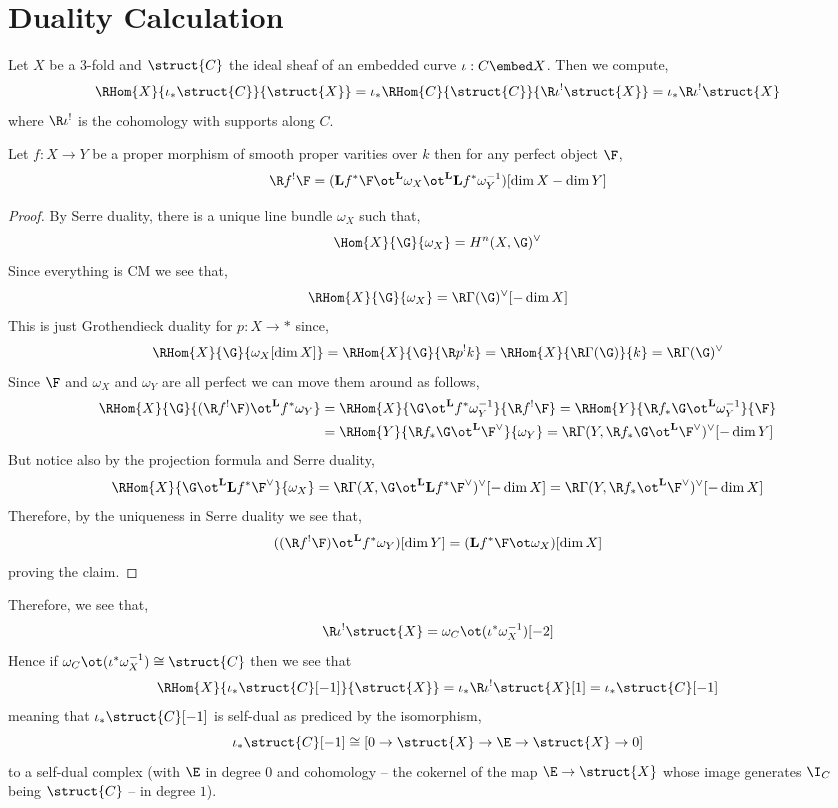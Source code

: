 \documentclass[12pt]{article}
\begin{document}
\section{Duality Calculation}

\newcommand{\bfL}{\mathbf{L}}

Let $X$ be a 3-fold and $\struct{C}$ the ideal sheaf of an embedded curve $\iota : C \embed X$. Then we compute,
\[ \RHom{X}{\iota_* \struct{C}}{\struct{X}} = \iota_* \RHom{C}{\struct{C}}{\R \iota^! \struct{X}} = \iota_* \R \iota^! \struct{X} \]
where $\R \iota^!$ is the cohomology with supports along $C$. 

\begin{prop}
Let $f : X \to Y$ be a proper morphism of smooth proper varities over $k$ then for any perfect object $\F$,
 \[ \R f^! \F = (\bfL f^* \F \ot^{\bfL} \omega_X \ot^{\bfL} \bfL f^* \omega_Y^{-1}) [\dim{X} - \dim{Y}] \]
\end{prop}

\begin{proof}
By Serre duality, there is a unique line bundle $\omega_X$ such that,
\[ \Hom{X}{\G}{\omega_X} = H^n(X, \G)^\vee \]
Since everything is CM we see that,
\[ \RHom{X}{\G}{\omega_X} = \R \Gamma(\G)^\vee [-\dim{X}] \]
This is just Grothendieck duality for $p : X \to *$ since,
\[ \RHom{X}{\G}{\omega_X[\dim{X}]} = \RHom{X}{\G}{\R p^! k} = \RHom{X}{\R \Gamma(\G)}{k}  = \R \Gamma(\G)^{\vee} \]
Since $\F$ and $\omega_X$ and $\omega_Y$ are all perfect we can move them around as follows,
\begin{align*}
\RHom{X}{\G}{(\R f^! \F) \ot^{\bfL} f^* \omega_Y} &= \RHom{X}{\G \ot^{\bfL} f^* \omega_Y^{-1}}{\R f^! \F} = \RHom{Y}{\R f_* \G \ot^{\bfL} \omega_Y^{-1}}{\F} 
\\
& = \RHom{Y}{\R f_* \G \ot^{\bfL} \F^\vee}{\omega_Y} = \R\Gamma(Y, \R f_* \G \ot^{\bfL} \F^\vee)^\vee [-\dim{Y}] 
\end{align*}
But notice also by the projection formula and Serre duality,
\[ \RHom{X}{\G \ot^{\bfL} \bfL f^* \F^\vee}{\omega_X} = \R \Gamma(X, \G \ot^{\bfL} \bfL f^* \F^\vee)^\vee [-\dim{X}] = \R\Gamma(Y, \R f_* \ot^{\bfL} \F^\vee)^\vee [-\dim{X}]  \]
Therefore, by the uniqueness in Serre duality we see that,
\[ ((\R f^! \F) \ot^{\bfL} f^* \omega_Y)[\dim{Y}] = (\bfL f^* \F \ot \omega_X)[\dim{X}] \]
proving the claim.
\end{proof}
Therefore, we see that,
\[ \R \iota^! \struct{X} = \omega_C \ot (\iota^* \omega_X^{-1}) [-2] \]
Hence if $\omega_C \ot (\iota^* \omega_X^{-1}) \cong \struct{C}$ then we see that
\[ \RHom{X}{\iota_* \struct{C}[-1]}{\struct{X}} = \iota_* \R \iota^! \struct{X}[1] = \iota_* \struct{C}[-1] \]
meaning that $\iota_* \struct{C}[-1]$ is self-dual as prediced by the isomorphism,
\[ \iota_* \struct{C}[-1] \cong [0 \to \struct{X} \to \E \to \struct{X} \to 0] \]
to a self-dual complex (with $\E$ in degree $0$ and cohomology -- the cokernel of the map $\E \to \struct{X}$ whose image generates $\I_C$ being $\struct{C}$ -- in degree $1$). 
\end{document}
